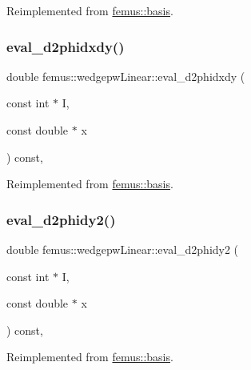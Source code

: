 Reimplemented from \mbox{\hyperlink{classfemus_1_1basis_a0a9839e75d1c9c8302486fc072eed028}{femus\+::basis}}.

\mbox{\label{classfemus_1_1wedgepw_linear_acc622e61ab2a2c8d81a888600aaa049b}} 
\subsubsection{\texorpdfstring{eval\+\_\+d2phidxdy()}{eval\_d2phidxdy()}}
{\footnotesize\ttfamily double femus\+::wedgepw\+Linear\+::eval\+\_\+d2phidxdy (\begin{DoxyParamCaption}\item[{const int $\ast$}]{I,  }\item[{const double $\ast$}]{x }\end{DoxyParamCaption}) const\hspace{0.3cm}{\ttfamily [inline]}, {\ttfamily [virtual]}}



Reimplemented from \mbox{\hyperlink{classfemus_1_1basis_ac9feaf9e60421143db2a3708f3c7fa48}{femus\+::basis}}.

\mbox{\label{classfemus_1_1wedgepw_linear_adcd46d6d590e3c11b1b244bfe15d7333}} 
\subsubsection{\texorpdfstring{eval\+\_\+d2phidy2()}{eval\_d2phidy2()}}
{\footnotesize\ttfamily double femus\+::wedgepw\+Linear\+::eval\+\_\+d2phidy2 (\begin{DoxyParamCaption}\item[{const int $\ast$}]{I,  }\item[{const double $\ast$}]{x }\end{DoxyParamCaption}) const\hspace{0.3cm}{\ttfamily [inline]}, {\ttfamily [virtual]}}



Reimplemented from \mbox{\hyperlink{classfemus_1_1basis_a0febb29fe4b32213ff8d6d428f7241cd}{femus\+::basis}}.

